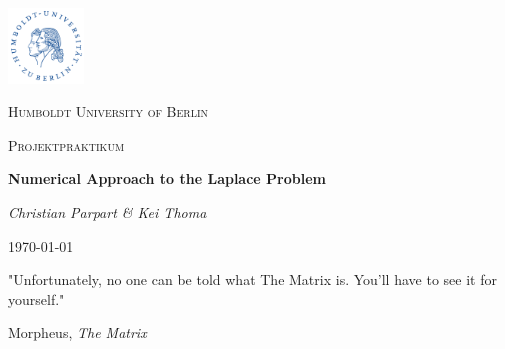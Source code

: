 \begin{titlepage}
	\centering
	\includegraphics[width=0.15\textwidth]{graphic/huberlin_logo}\par\vspace{1cm}
	{\scshape\LARGE Humboldt University of Berlin \par}
	\vspace{1cm}
	{\scshape\Large Projektpraktikum \par}
	\vspace{1.5cm}
	{\huge\bfseries Numerical Approach to the Laplace Problem \par}
	\vspace{2cm}
	{\Large\itshape Christian Parpart \& Kei Thoma \par}
	\vfill

	\vfill

	{\large \today\par}
\end{titlepage}

\tableofcontents

\vspace*{\fill}
    \epigraph{"Unfortunately, no one can be told what The Matrix is. You'll have to see it for yourself."}{Morpheus, \emph{The Matrix}
    }